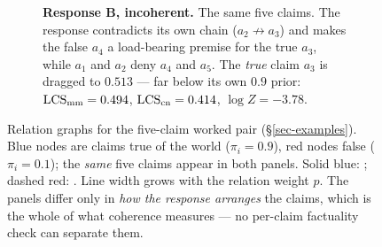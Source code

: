 \begin{figure}[t]
\begin{subfigure}[t]{0.49\textwidth}
{}
\caption{\textbf{Response B, incoherent.} The same five claims. The response
  contradicts its own chain ($a_2\!\not\to\!a_3$) and makes the false $a_4$ a
  load-bearing premise for the true $a_3$, while $a_1$ and $a_2$ deny $a_4$ and
  $a_5$. The \emph{true} claim $a_3$ is dragged to $0.513$ --- far below its own
  $0.9$ prior: $\mathrm{LCS}_{\mathrm{mm}}=0.494$, $\mathrm{LCS}_{\mathrm{cn}}=0.414$, $\log Z=-3.78$.}
\label{fig:pair-incoherent}
\end{subfigure}
\caption{Relation graphs for the five-claim worked pair (\S\ref{sec-examples}).
  Blue nodes are claims true of the world ($\pi_i=0.9$), red nodes false
  ($\pi_i=0.1$); the \emph{same} five claims appear in both panels. Solid blue:
  \ent{}; dashed red: \con{}. Line width grows with the relation weight $p$.
  The panels differ only in \emph{how the response arranges} the claims, which is
  the whole of what coherence measures --- no per-claim factuality check can
  separate them.}
\label{fig:pair-graphs}
\end{figure}
